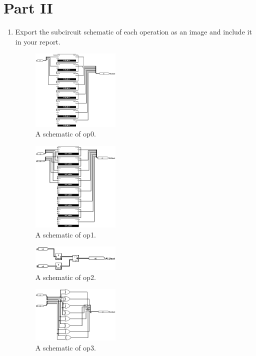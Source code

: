 \documentclass{article}
\begin{document}
\section*{Part II}

\begin{enumerate}
\item Export the subcircuit schematic of each operation as an image and include it in your report.

\begin{figure}[ht!]
    \centering
    \includegraphics[width=0.4\textwidth]{lab3_op0.png}
    \caption{A schematic of op0.}
    \label{f:op0}
\end{figure}

\begin{figure}[ht!]
    \centering
    \includegraphics[width=0.4\textwidth]{lab3_op1.png}
    \caption{A schematic of op1.}
    \label{f:op1}
\end{figure}

\begin{figure}[ht!]
    \centering
    \includegraphics[width=0.4\textwidth]{lab3_op2.png}
    \caption{A schematic of op2.}
    \label{f:op2}
\end{figure}

\begin{figure}[ht!]
    \centering
    \includegraphics[width=0.4\textwidth]{lab3_op3.png}
    \caption{A schematic of op3.}
    \label{f:op3}
\end{figure}


\end{enumerate}
\end{document}
